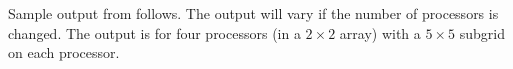 Sample output from  follows. The output will vary if the
number of processors is changed. The output is for four processors 
(in a $2 \times 2$ array) with a $5 \times 5$ subgrid on each processor.

{\small}
